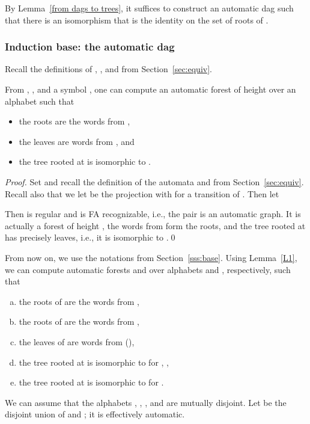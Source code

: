 \documentclass[envcountsame]{llncs}
\begin{document}
By Lemma~\ref{from dags to trees}, it suffices to construct an
automatic dag  such that there is an isomorphism
 that is the identity on
the set of roots of .

\subsubsection{Induction base: the automatic dag }

Recall the definitions of
, ,
and  from Section~\ref{sec:equiv}.


\begin{lemma}\label{L1}
  From , , and
  a symbol , one can compute an automatic
  forest of height  over an alphabet
   such that
  \begin{itemize}
  \item the roots are the words from ,
  \item the leaves are words from , and
  \item the tree rooted at  is
    isomorphic to .
  \end{itemize}
\end{lemma}

\begin{proof}
  Set 
  and recall the definition of the automata  and 
  from Section~\ref{sec:equiv}.  Recall also that we let  be the
  projection with  for a transition  of .
  Then let
  
  Then  is regular and
   is FA recognizable, i.e., the pair 
  is an automatic graph. It is actually a forest of height , the
  words from  form the roots, and the tree rooted
  at  has precisely
   leaves, i.e., it is isomorphic to
  .\qed
\end{proof}
{}From now on, we use the notations from Section~\ref{sss:base}.
Using Lemma~\ref{L1}, we can compute automatic forests 
and  over alphabets
 and
, respectively, such that
\begin{enumerate}[(a)]
  \item the roots of  are the words from
    ,
  \item the roots of  are the words from ,
  \item the leaves of  are words from  (),
  \item the tree rooted at 
    is isomorphic to  for , ,
  \item the tree rooted at  is isomorphic to
     for .
\end{enumerate}
We can assume that the alphabets , ,
, and  are mutually disjoint.
Let  be the disjoint union of 
and ; it is effectively automatic.
\end{document}
